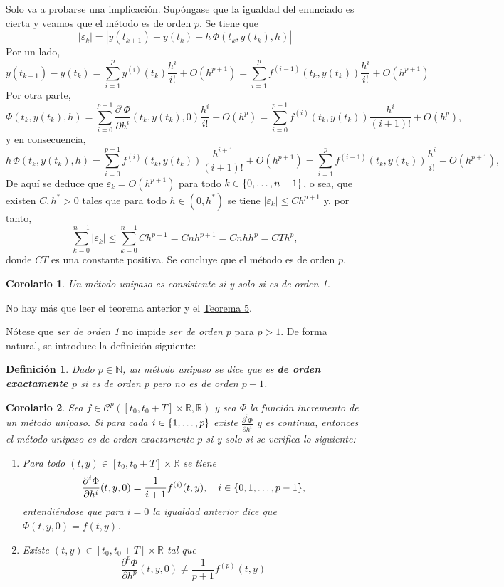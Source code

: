 \documentclass[11pt]{report}
\makeatletter
\renewenvironment{proof}[1][\proofname]{\par
  \pushQED{\qed}%
  \normalfont \topsep\z@skip %
  \trivlist
  \item[\hskip\labelsep
        \itshape
    #1\@addpunct{.}]\ignorespaces
}{%
  \popQED\endtrivlist\@endpefalse
}
\theoremstyle{mytheorem}
\newtheorem{corollary}{Corolario} %
\theoremstyle{mydefinition}
\newtheorem{definition}{Definición}
\theoremstyle{myexample}
\let\oldproofname=\proofname
\renewcommand{\proofname}{\rm\bf{\oldproofname}}}
\newenvironment{cdefinition} %
  {\begin{mdframed}[
        linewidth=3pt,
        linecolor=c1,
        bottomline=false,
        topline=false,
        rightline=false,
        innerrightmargin=0pt,
        innertopmargin=0pt,
        innerbottommargin=0pt,
        innerleftmargin=1em, %
        skipabove=\baselineskip]
    \begin{definition}}
  {\end{definition}\end{mdframed}}
\newenvironment{ccorollary} %
  {\begin{mdframed}[
        linewidth=3pt,
        linecolor=c2,
        bottomline=false,
        topline=false,
        rightline=false,
        innerrightmargin=0pt,
        innertopmargin=0pt,
        innerbottommargin=0pt,
        innerleftmargin=1em, %
        skipabove=\baselineskip]
    \begin{corollary}}
  {\end{corollary}\end{mdframed}}
\newcommand{\R}{\mathbb R}
\newcommand{\N}{\mathbb N}
\newcommand{\mybf}[1]{\boldmath\textbf{\color{c1}#1}\unboldmath}
\makeatother
\begin{document}
\begin{proof}
Solo va a probarse una implicación. Supóngase que la igualdad del enunciado es cierta y veamos que el método es de orden $p$. Se tiene que
\[|\varepsilon_k| = |y(t_{k+1})-y(t_k)-h \, \Phi(t_k,y(t_k),h)|\]
Por un lado,
\[y(t_{k+1})-y(t_k) = \sum_{i=1}^p y^{(i)}(t_k)\frac{h^i}{i!}+O(h^{p+1}) = \sum_{i=1}^p f^{(i-1)}(t_k,y(t_k))\frac{h^i}{i!}+O(h^{p+1})\]
Por otra parte,
\[\Phi(t_k,y(t_k),h) = \sum_{i=0}^{p-1} \frac{\partial^i \Phi}{\partial h^i}(t_k,y(t_k),0)\frac{h^i}{i!}+O(h^p) = \sum_{i=0}^{p-1}f^{(i)}(t_k,y(t_k))\frac{h^{i}}{(i+1)!}+O(h^p),\]
y en consecuencia,
\[h \, \Phi(t_k,y(t_k),h) = \sum_{i=0}^{p-1}f^{(i)}(t_k,y(t_k))\frac{h^{i+1}}{(i+1)!}+O(h^{p+1}) = \sum_{i=1}^{p}f^{(i-1)}(t_k,y(t_k))\frac{h^{i}}{i!}+O(h^{p+1}),\]
De aquí se deduce que $\varepsilon_k = O(h^{p+1})$
para todo $k \in \{0,\mathellipsis,n-1\}$, o sea, que existen $C,h^*>0$ tales que para todo $h \in (0,h^*)$ se tiene $|\varepsilon_k| \leq Ch^{p+1}$ y, por tanto,
\[\sum_{k=0}^{n-1} |\varepsilon_k| \leq \sum_{k=0}^{n-1} Ch^{p-1} = Cnh^{p+1} = Cnhh^p = CTh^p,\]
donde $CT$ es una constante positiva. Se concluye que el método es de orden $p$.
\end{proof}

\begin{ccorollary}
\label{cor3}
Un método unipaso es consistente si y solo si es de orden 1.
\end{ccorollary}

\begin{proof}
No hay más que leer el teorema anterior y el \hyperref[teo2.6]{\color{gray}Teorema 5}.
\end{proof}

Nótese que \emph{ser de orden 1} no impide \emph{ser de orden $p$} para $p >1$. De forma natural, se introduce la definición siguiente:

\begin{cdefinition}
Dado $p \in \N$, un método unipaso se dice que es \mybf{de orden exactamente $p$} si es de orden $p$ pero no es de orden $p+1$.
\end{cdefinition}

\begin{ccorollary}
Sea $f \in \mathcal{C}^p([t_0,t_0+T] \times \R,\R)$ y sea $\Phi$ la función incremento de un método unipaso. Si para cada $i \in \{1,\mathellipsis,p\}$ existe $\frac{\partial^i \Phi}{\partial h^i}$ y es continua, entonces el método unipaso es de orden exactamente $p$ si y solo si se verifica lo siguiente:
\begin{enumerate}
    \item Para todo $(t,y) \in [t_0,t_0+T] \times \R$ se tiene
    \[\frac{\partial^{i}\Phi}{\partial h^{i}}(t,y,0) = \frac{1}{i+1}f^{(i)}(t,y), \quad i \in \{0,1,\mathellipsis,p-1\},\]
    entendiéndose que para $i = 0$ la igualdad anterior dice que $\Phi(t,y,0) = f(t,y)$.
\item Existe $(t,y) \in [t_0,t_0+T] \times \R$ tal que
\[\frac{\partial^p \Phi}{\partial h^p}(t,y,0) \neq \frac{1}{p+1}f^{(p)}(t,y)\]

\end{enumerate}

\end{ccorollary}
\end{document}

